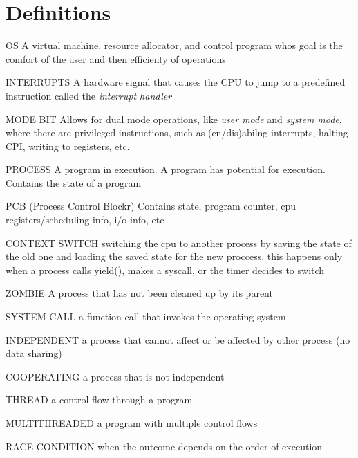 \newcommand{\deff} [2] {\uppercase{\scriptsize #1} {\tiny #2}}
\section{Definitions}


\deff{OS}{A virtual machine, resource allocator, and control program whos goal
is the comfort of the user and then efficienty of operations}

\deff{Interrupts}{A hardware signal that causes the CPU to jump to a predefined
instruction called the \textit{interrupt handler}}

\deff{Mode Bit}{Allows for dual mode operations, like \textit{user mode} and
\textit{system mode}, where there are privileged instructions, such as (en/dis)abilng
interrupts, halting CPI, writing to registers, etc.}

\deff{Process}{A program in execution. A program has potential for execution.
Contains the state of a program}

\deff{PCB}{(Process Control Blockr) Contains state, program counter, cpu
registers/scheduling info, i/o info, etc}

\deff{Context Switch}{switching the cpu to another process by saving the state
of the old one and loading the saved state for the new proccess. this happens
only when a process calls yield(), makes a syscall, or the timer decides to
switch}

\deff{Zombie}{A process that has not been cleaned up by its parent}

\deff{System Call}{a function call that invokes the operating system}

\deff{independent}{a process that cannot affect or be affected by other process (no data sharing)}

\deff{cooperating}{a process that is not independent}

\deff{thread}{a control flow through a program}

\deff{multithreaded}{a program with multiple control flows}

\deff{race condition}{when the outcome depends on the order of execution}

